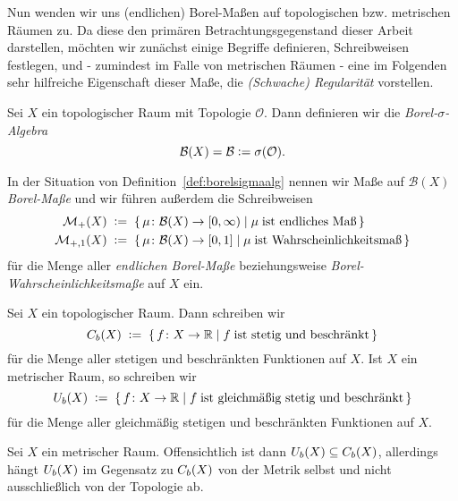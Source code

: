 \documentclass[../main/main.tex]{subfiles}
\begin{document}
	Nun wenden wir uns (endlichen) Borel-Maßen auf topologischen bzw. metrischen Räumen zu. Da diese den primären Betrachtungsgegenstand dieser
	Arbeit darstellen, möchten wir zunächst einige Begriffe definieren, Schreibweisen festlegen, und - zumindest im Falle von metrischen Räumen - eine im Folgenden sehr 
	hilfreiche Eigenschaft dieser Maße, die \emph{(Schwache) Regularität} vorstellen.
	
	\begin{Definition}
		\label{def:borelsigmaalg}
		Sei $X$ ein topologischer Raum mit Topologie $\mathcal{O}$. Dann definieren wir die
		\emph{Borel-$\sigma$-Algebra} 
		$$\mathcal{B}(X) = \mathcal{B} \vcentcolon = \sigma(\mathcal{O}) \text{.}$$
	\end{Definition}

	\begin{Definition}
		In der Situation von Definition~\ref{def:borelsigmaalg} nennen wir Maße auf $\mathcal{B}(X)$ \emph{Borel-Maße} und wir führen außerdem die Schreibweisen
		\begin{align*}
			\mathcal{M}_{+}(X)  \; &\vcentcolon = \; \left\{\, \mu \colon \mathcal{B}(X) \to [0,\infty) \; \middle| \; \mu \; 
				\text{ist endliches Maß} \,\right\} \\
			\mathcal{M}_{+,1}(X) \; &\vcentcolon = \; \left\{\, \mu \colon \mathcal{B}(X) \to [0,1] \; \middle| \; \mu \; 
				\text{ist Wahrscheinlichkeitsmaß} \,\right\}
		\end{align*}
		für die Menge aller \emph{endlichen Borel-Maße} beziehungsweise \emph{Borel-Wahrscheinlichkeitsmaße} auf $X$ ein.
	\end{Definition}
	
	\begin{Definition}
		Sei $X$ ein topologischer Raum. Dann schreiben wir
		\[ C_b(X) \; \vcentcolon = \; \left\{\, f \colon X \to \mathbb{R} \; \middle| \; f \; \text{ist stetig und beschränkt} \,\right\} \]
		für die Menge aller stetigen und beschränkten Funktionen auf $X$. 
		Ist $X$ ein metrischer Raum, so schreiben wir
		\[ U_b(X) \; \vcentcolon = \; \left\{\, f \colon X \to \mathbb{R} \; \middle| \; f \; \text{ist gleichmäßig stetig und beschränkt} \,\right\} \]
		für die Menge aller gleichmäßig stetigen und beschränkten Funktionen auf $X$. 
	\end{Definition}
	
	\begin{Bemerkung}
		Sei $X$ ein metrischer Raum. Offensichtlich ist dann $U_b(X) \subseteq C_b(X)$, allerdings hängt $U_b(X)$ im Gegensatz 
		zu $C_b(X)$ von der Metrik selbst und nicht ausschließlich von der Topologie ab.
	\end{Bemerkung}
	
\end{document}
